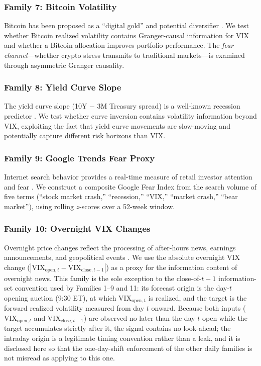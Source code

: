 \documentclass[12pt,a4paper]{article}
\begin{document}
\subsubsection{Family 7: Bitcoin Volatility}

Bitcoin has been proposed as a ``digital gold'' and potential diversifier \citep{bouri2017}. We test whether Bitcoin realized volatility contains Granger-causal information for VIX and whether a Bitcoin allocation improves portfolio performance. The \emph{fear channel}---whether crypto stress transmits to traditional markets---is examined through asymmetric Granger causality.

\subsubsection{Family 8: Yield Curve Slope}

The yield curve slope (10Y $-$ 3M Treasury spread) is a well-known recession predictor \citep{estrella1998}. We test whether curve inversion contains volatility information beyond VIX, exploiting the fact that yield curve movements are slow-moving and potentially capture different risk horizons than VIX.

\subsubsection{Family 9: Google Trends Fear Proxy}

Internet search behavior provides a real-time measure of retail investor attention and fear \citep{da2011, preis2013}. We construct a composite Google Fear Index from the search volume of five terms (``stock market crash,'' ``recession,'' ``VIX,'' ``market crash,'' ``bear market''), using rolling $z$-scores over a 52-week window.

\subsubsection{Family 10: Overnight VIX Changes}

Overnight price changes reflect the processing of after-hours news, earnings announcements, and geopolitical events \citep{lou2019}. We use the absolute overnight VIX change ($|\text{VIX}_{\text{open},t} - \text{VIX}_{\text{close},t-1}|$) as a proxy for the information content of overnight news. This family is the sole exception to the close-of-$t{-}1$ information-set convention used by Families 1--9 and 11: its forecast origin is the day-$t$ opening auction (9:30 ET), at which $\text{VIX}_{\text{open},t}$ is realized, and the target is the forward realized volatility measured from day $t$ onward. Because both inputs ($\text{VIX}_{\text{open},t}$ and $\text{VIX}_{\text{close},t-1}$) are observed no later than the day-$t$ open while the target accumulates strictly after it, the signal contains no look-ahead; the intraday origin is a legitimate timing convention rather than a leak, and it is disclosed here so that the one-day-shift enforcement of the other daily families is not misread as applying to this one.
\end{document}

